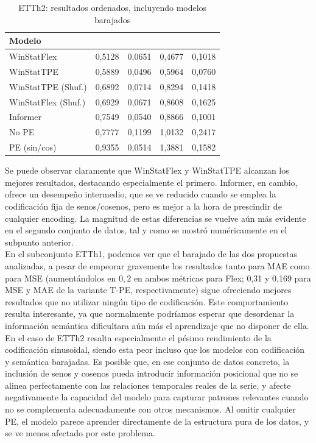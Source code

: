 \begin{table}[ht]
	\centering
	\begin{tabular}{l|NN|NN}
		\toprule
		Modelo &  &  &  &  \\
		\midrule
		WinStatFlex            & 0,5128 & 0,0651 & 0,4677 & 0,1018 \\
		WinStatTPE             & 0,5889 & 0,0496 & 0,5964 & 0,0760 \\
		WinStatTPE (Shuf.)     & 0,6892 & 0,0714 & 0,8294 & 0,1418 \\
		WinStatFlex (Shuf.)    & 0,6929 & 0,0671 & 0,8608 & 0,1625 \\
		Informer               & 0,7549 & 0,0540 & 0,8866 & 0,1001 \\
		No PE                  & 0,7777 & 0,1199 & 1,0132 & 0,2417 \\
		PE (sin/cos)           & 0,9355 & 0,0514 & 1,3881 & 0,1582 \\
		\bottomrule
	\end{tabular}
	\caption{ETTh2: resultados ordenados, incluyendo modelos barajados}
	\label{etth2fintab}
\end{table}


Se puede observar claramente que WinStatFlex y WinStatTPE alcanzan los mejores resultados, destacando especialmente el primero. Informer, en cambio, ofrece un desempeño intermedio, que se ve reducido cuando se emplea la codificación fija de senos/cosenos, pero es mejor a la hora de prescindir de cualquier encoding. La magnitud de estas diferencias se vuelve aún más evidente en el segundo conjunto de datos, tal y como se mostró numéricamente en el subpunto anterior.\\

En el subconjunto ETTh1, podemos ver que el barajado de las dos propuestas analizadas, a pesar de empeorar gravemente los resultados tanto para MAE como para MSE (aumentándolos en $0,2$ en ambos métricas para Flex; 0,31 y 0,169 para MSE y MAE de la variante T-PE, respectivamente) sigue ofreciendo mejores resultados que no utilizar ningún tipo de codificación. Este comportamiento resulta interesante, ya que normalmente podríamos esperar que desordenar la información semántica dificultara aún más el aprendizaje que no disponer de ella.\\

En el caso de ETTh2 resalta especialmente el pésimo rendimiento de la codificación sinusoidal, siendo esta peor incluso que los modelos con codificación y semántica barajadas. Es posible que, en ese conjunto de datos concreto, la inclusión de senos y cosenos pueda introducir información posicional que no se alinea perfectamente con las relaciones temporales reales de la serie, y afecte negativamente la capacidad del modelo para capturar patrones relevantes cuando no se complementa adecuadamente con otros mecanismos. Al omitir cualquier PE, el modelo parece aprender directamente de la estructura pura de los datos, y se ve menos afectado por este problema.\\

